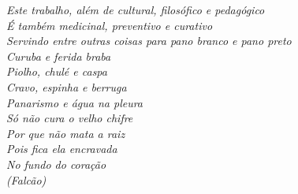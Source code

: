 \begin{epigrafe}[]
    \vspace*{\fill}
	\begin{flushright}
	
		\textit{Este trabalho, além de cultural, filosófico e pedagógico\\
				É também medicinal, preventivo e curativo\\
				Servindo entre outras coisas para pano branco e pano preto\\
				Curuba e ferida braba\\
				Piolho, chulé e caspa\\
				Cravo, espinha e berruga\\
				Panarismo e água na pleura\\
				Só não cura o velho chifre\\
				Por que não mata a raiz\\
				Pois fica ela encravada\\
				No fundo do coração\\
				(Falcão)}
		
	\end{flushright}
\end{epigrafe}
